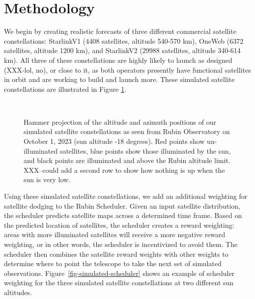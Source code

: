 \documentclass[linenumbers]{aastex631}
\begin{document}

\section{Methodology}
We begin by creating realistic forecasts of three different commercial satellite constellations: StarlinkV1 (4408 satellites, altitude 540-570 km), OneWeb (6372 satellites, altitude 1200 km), and StarlinkV2 (29988 satellites, altitude 340-614 km). All three of these constellations are highly likely to launch as designed (XXX-lol, no), or close to it, as both operators presently have functional satellites in orbit and are working to build and launch more. These simulated satellite
constellations are illustrated in Figure \ref{fig-simulated-constellations}.

\begin{figure}[ht!]
\\
\caption{Hammer projection of the altitude and azimuth positions of our simulated satellite constellations as seen from Rubin Observatory on October 1, 2023 (sun altitude -18 degrees). Red points show un-illuminated satellites, blue points show those illuminated by the sun, and black points are illuminated and above the Rubin altitude limit. \label{fig-simulated-constellations} XXX--could add a second row to show how nothing is up when the sun is very low.}
\end{figure}

Using these simulated satellite constellations, we add an additional weighting for satellite
dodging to the Rubin Scheduler. Given an input satellite distribution, the scheduler predicts
satellite maps across a determined time frame. Based on the predicted location of satellites, the
scheduler creates a reward weighting: areas with more illuminated satellites will receive a more
negative reward weighting, or in other words, the scheduler is incentivized to avoid them. The
scheduler then combines the satellite reward weights with other weights to determine where to
point the telescope to take the next set of simulated observations. Figure~\ref{fig-simulated-scheduler} shows an example of
scheduler weighting for the three simulated satellite constellations at two different sun altitudes.
\end{document}

